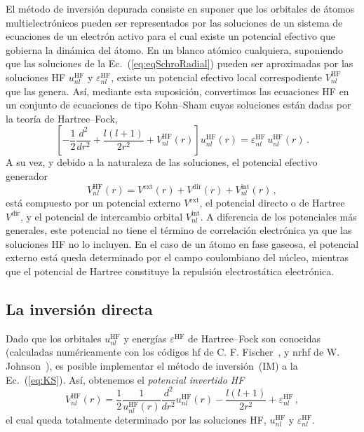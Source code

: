 El método de inversión depurada consiste en suponer que los orbitales
de átomos multielectrónicos pueden ser representados por las soluciones
de un sistema de ecuaciones de un electrón activo para el cual existe 
un potencial efectivo que gobierna la dinámica del átomo. 
En un blanco atómico cualquiera, suponiendo que las soluciones de la 
Ec.~(\ref{eq:eqSchroRadial}) pueden ser aproximadas por las soluciones 
HF $u_{nl}^{\mathrm{HF}}$ y $\varepsilon_{nl}^{\mathrm{HF}}$, existe un 
potencial efectivo local correspodiente $V_{nl}^{\mathrm{HF}}$ que las 
genera. Así, mediante esta suposición, convertimos las ecuaciones HF en 
un conjunto de ecuaciones de tipo Kohn--Sham cuyas soluciones están 
dadas por la teoría de Hartree--Fock,
\begin{equation}
\left[ 
-\frac{1}{2}\frac{d^{2}}{dr^{2}} + \frac{l(l+1)}{2r^{2}} + 
V_{nl}^{\mathrm{HF}}(r) 
\right] u_{nl}^{\mathrm{HF}}(r)
   = \varepsilon_{nl}^{\mathrm{HF}}\, u_{nl}^{\mathrm{HF}}(r) \, .
\label{eq:KS}
\end{equation}
A su vez, y debido a la naturaleza de las soluciones, el potencial 
efectivo generador
\begin{equation}
V_{nl}^{\mathrm{HF}}(r) = V^{\mathrm{ext}}(r) + 
V^{\mathrm{dir}}(r) + V_{nl}^{\mathrm{int}}(r) \, ,  
\label{eq:veff}
\end{equation}
está compuesto por un potencial externo $V^{\mathrm{ext}}$, 
el potencial directo o de Hartree $V^{\mathrm{dir}}$, y el potencial
de intercambio orbital $V_{nl}^{\mathrm{int}}$. A diferencia de los
potenciales más generales, este potencial no tiene el término de 
correlación electrónica ya que las soluciones HF no lo incluyen. En el 
caso de un átomo en fase gaseosa, el potencial externo está queda 
determinado por el campo coulombiano del núcleo, mientras que el 
potencial de Hartree constituye la repulsión electrostática electrónica. 


\subsection{La inversión directa}
\label{subsec:inversion}

Dado que los orbitales $u_{nl}^{\mathrm{HF}}$ y energías  
$\varepsilon^{\mathrm{HF}}$ de Hartree--Fock son conocidas (calculadas 
numéricamente con los códigos {\sc hf} de C. F. 
Fischer~\cite{FroeseFischer:97}, y {\sc nrhf} de 
W. Johnson~\cite{Johnson:07}), es posible implementar el método de 
inversión~(\acs{IM}) a la Ec.~(\ref{eq:KS}). Así, obtenemos el 
\textit{potencial invertido HF} 
\begin{equation}
V_{nl}^{\mathrm{HF}}(r) = 
\frac{1}{2}\frac{1}{u_{nl}^{\mathrm{HF}}(r)}
\frac{d^2}{dr^{2}}u_{nl}^{\mathrm{HF}}(r) - 
\frac{l(l+1)}{2r^{2}}+\varepsilon _{nl}^{\mathrm{HF}} \,,
\label{eq:VHF}
\end{equation}
el cual queda totalmente determinado por las soluciones HF,
$u_{nl}^{\mathrm{HF}}$ y $\varepsilon_{nl}^{\mathrm{HF}}$.

